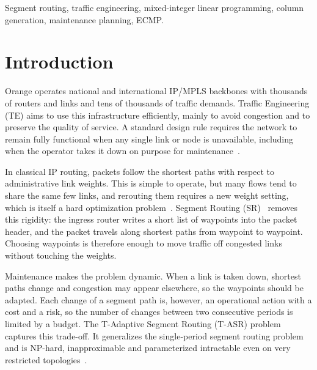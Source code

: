 \documentclass[conference]{IEEEtran}
\begin{document}
\begin{IEEEkeywords}
Segment routing, traffic engineering, mixed-integer linear programming, column generation, maintenance planning, ECMP.
\end{IEEEkeywords}

\section{Introduction}

Orange operates national and international IP/MPLS backbones with thousands of routers and links and tens of thousands of traffic demands. Traffic Engineering (TE) aims to use this infrastructure efficiently, mainly to avoid congestion and to preserve the quality of service. A standard design rule requires the network to remain fully functional when any single link or node is unavailable, including when the operator takes it down on purpose for maintenance~\cite{subject}.

In classical IP routing, packets follow the shortest paths with respect to administrative link weights. This is simple to operate, but many flows tend to share the same few links, and rerouting them requires a new weight setting, which is itself a hard optimization problem~\cite{fortz2000}. Segment Routing (SR)~\cite{rfc8402} removes this rigidity: the ingress router writes a short list of waypoints into the packet header, and the packet travels along shortest paths from waypoint to waypoint. Choosing waypoints is therefore enough to move traffic off congested links without touching the weights.

Maintenance makes the problem dynamic. When a link is taken down, shortest paths change and congestion may appear elsewhere, so the waypoints should be adapted. Each change of a segment path is, however, an operational action with a cost and a risk, so the number of changes between two consecutive periods is limited by a budget. The T-Adaptive Segment Routing (T-ASR) problem~\cite{subject,benhamiche2026} captures this trade-off. It generalizes the single-period segment routing problem and is NP-hard, inapproximable and parameterized intractable even on very restricted topologies~\cite{benhamiche2026,bazgan2025}.
\end{document}
